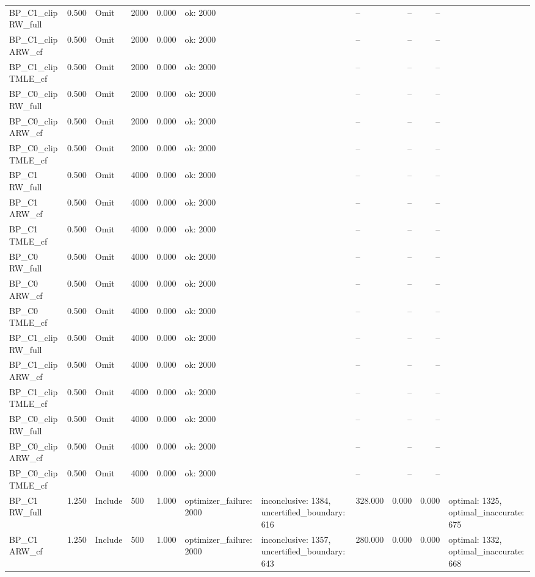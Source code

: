 \begin{tabular}{llllrlllrrl}
BP\_C1\_clip RW\_full & 0.500 & Omit & 2000 & 0.000 & ok: 2000 &  & -- & -- & -- &  \\
BP\_C1\_clip ARW\_cf & 0.500 & Omit & 2000 & 0.000 & ok: 2000 &  & -- & -- & -- &  \\
BP\_C1\_clip TMLE\_cf & 0.500 & Omit & 2000 & 0.000 & ok: 2000 &  & -- & -- & -- &  \\
BP\_C0\_clip RW\_full & 0.500 & Omit & 2000 & 0.000 & ok: 2000 &  & -- & -- & -- &  \\
BP\_C0\_clip ARW\_cf & 0.500 & Omit & 2000 & 0.000 & ok: 2000 &  & -- & -- & -- &  \\
BP\_C0\_clip TMLE\_cf & 0.500 & Omit & 2000 & 0.000 & ok: 2000 &  & -- & -- & -- &  \\
BP\_C1 RW\_full & 0.500 & Omit & 4000 & 0.000 & ok: 2000 &  & -- & -- & -- &  \\
BP\_C1 ARW\_cf & 0.500 & Omit & 4000 & 0.000 & ok: 2000 &  & -- & -- & -- &  \\
BP\_C1 TMLE\_cf & 0.500 & Omit & 4000 & 0.000 & ok: 2000 &  & -- & -- & -- &  \\
BP\_C0 RW\_full & 0.500 & Omit & 4000 & 0.000 & ok: 2000 &  & -- & -- & -- &  \\
BP\_C0 ARW\_cf & 0.500 & Omit & 4000 & 0.000 & ok: 2000 &  & -- & -- & -- &  \\
BP\_C0 TMLE\_cf & 0.500 & Omit & 4000 & 0.000 & ok: 2000 &  & -- & -- & -- &  \\
BP\_C1\_clip RW\_full & 0.500 & Omit & 4000 & 0.000 & ok: 2000 &  & -- & -- & -- &  \\
BP\_C1\_clip ARW\_cf & 0.500 & Omit & 4000 & 0.000 & ok: 2000 &  & -- & -- & -- &  \\
BP\_C1\_clip TMLE\_cf & 0.500 & Omit & 4000 & 0.000 & ok: 2000 &  & -- & -- & -- &  \\
BP\_C0\_clip RW\_full & 0.500 & Omit & 4000 & 0.000 & ok: 2000 &  & -- & -- & -- &  \\
BP\_C0\_clip ARW\_cf & 0.500 & Omit & 4000 & 0.000 & ok: 2000 &  & -- & -- & -- &  \\
BP\_C0\_clip TMLE\_cf & 0.500 & Omit & 4000 & 0.000 & ok: 2000 &  & -- & -- & -- &  \\
BP\_C1 RW\_full & 1.250 & Include & 500 & 1.000 & optimizer\_failure: 2000 & inconclusive: 1384, uncertified\_boundary: 616 & 328.000 & 0.000 & 0.000 & optimal: 1325, optimal\_inaccurate: 675 \\
BP\_C1 ARW\_cf & 1.250 & Include & 500 & 1.000 & optimizer\_failure: 2000 & inconclusive: 1357, uncertified\_boundary: 643 & 280.000 & 0.000 & 0.000 & optimal: 1332, optimal\_inaccurate: 668 \\

\end{tabular}
